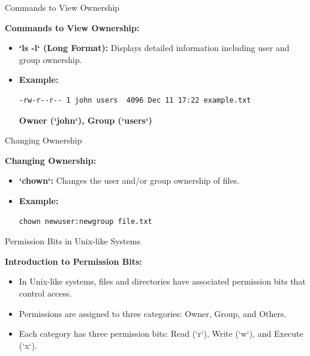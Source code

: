 \documentclass{beamer}
\begin{document}
\begin{frame}[fragile]{Commands to View Ownership}

  \textbf{Commands to View Ownership:}

  \begin{itemize}
    \item \textbf{`ls -l` (Long Format):} Displays detailed information including user and group ownership.
    \item \textbf{Example:} \\
      \begin{lstlisting}[frame=none]
      -rw-r--r-- 1 john users  4096 Dec 11 17:22 example.txt
      \end{lstlisting}
      \textbf{Owner (`john`), Group (`users`)}
  \end{itemize}

\end{frame}

\begin{frame}[fragile]{Changing Ownership}

  \textbf{Changing Ownership:}

  \begin{itemize}
    \item \textbf{`chown`:} Changes the user and/or group ownership of files.
    \item \textbf{Example:} \\
      \begin{lstlisting}[frame=none]
      chown newuser:newgroup file.txt
      \end{lstlisting}
  \end{itemize}

\end{frame}



\begin{frame}{Permission Bits in Unix-like Systems}

  \textbf{Introduction to Permission Bits:}

  \begin{itemize}
    \item In Unix-like systems, files and directories have associated permission bits that control access.
    \item Permissions are assigned to three categories: Owner, Group, and Others.
    \item Each category has three permission bits: Read (`r`), Write (`w`), and Execute (`x`).
  \end{itemize}

\end{frame}
\end{document}
